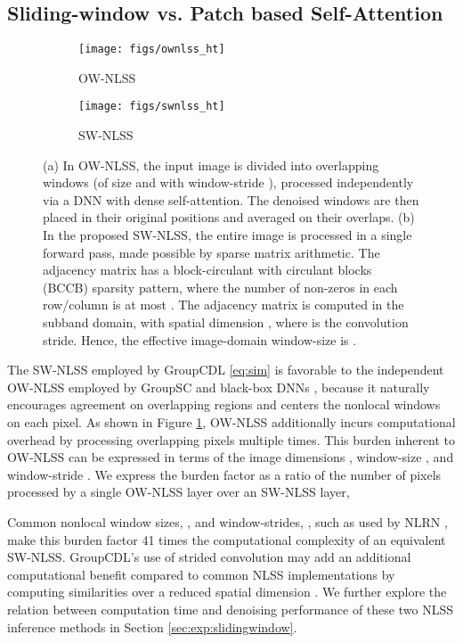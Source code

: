 \documentclass[lettersize,journal]{IEEEtran}
\begin{document}
\subsection{Sliding-window vs. Patch based Self-Attention} \label{sec:slidingwindow}
\begin{figure}[thb]
    \centering
    \begin{subfigure}{\linewidth}
        \centering
        \texttt{[image: figs/ownlss\_ht]}
        \caption{OW-NLSS}
        \vspace*{1em}
    \end{subfigure}
    \begin{subfigure}{\linewidth}
        \centering 
        \texttt{[image: figs/swnlss\_ht]}
        \caption{SW-NLSS}
    \end{subfigure}
    \caption{
        (a) In OW-NLSS, the input image is divided into overlapping windows (of size  and with window-stride ), processed
        independently via a DNN with dense self-attention. The denoised windows
        are then placed in their original positions and averaged on their
        overlaps. (b) In the proposed SW-NLSS, the entire image is processed in a single forward pass, made possible by sparse matrix arithmetic. The
        adjacency matrix has a block-circulant with circulant blocks (BCCB)
        sparsity pattern, where the number of non-zeros in each row/column is
        at most . The adjacency matrix is computed in the subband
        domain, with spatial dimension , where  is the
        convolution stride. Hence, the effective image-domain window-size is .
    }
    \label{fig:nlss}
\end{figure}
The SW-NLSS employed by GroupCDL \eqref{eq:sim} is favorable to the independent OW-NLSS employed by GroupSC
\cite{lecouat2020nonlocal} and black-box DNNs \cite{liu2018non, zhang2019residual}, 
because it naturally encourages agreement on overlapping regions and centers
the nonlocal windows on each pixel. 
As shown in Figure \ref{fig:nlss}, OW-NLSS additionally incurs computational
overhead by processing overlapping pixels multiple times. This burden inherent
to OW-NLSS can be expressed in terms of the image dimensions ,
window-size , and window-stride . We express the burden factor as a ratio of the number of pixels
processed by a single OW-NLSS layer over an SW-NLSS layer,

Common nonlocal window sizes, ,  and window-strides, , such as used by NLRN \cite{liu2018non}, make this burden factor 41 times the
computational complexity of an equivalent SW-NLSS. GroupCDL's use of strided
convolution may add an additional   computational benefit compared
to common NLSS implementations by computing similarities over a reduced spatial
dimension . We further explore the relation between computation
time and denoising performance of these two NLSS inference methods in Section
\ref{sec:exp:slidingwindow}.
\end{document}
